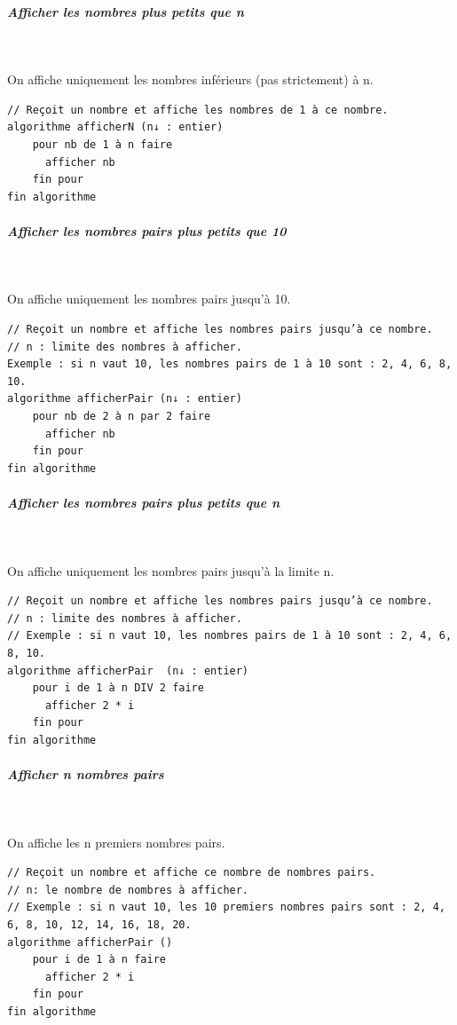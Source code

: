 \documentclass[11pt,a4paper]{article}
\begin{document}
		\subparagraph{Afficher les nombres plus petits que n} 
		
					\textcolor{white}{.} \par
				On affiche uniquement les nombres inf\'erieurs (pas strictement) \`a n.
            \par
        \begin{verbatim}
// Reçoit un nombre et affiche les nombres de 1 à ce nombre.
algorithme afficherN (n↓ : entier)
    pour nb de 1 à n faire
      afficher nb
    fin pour
fin algorithme
    \end{verbatim}
			
		\subparagraph{Afficher les nombres pairs plus petits que 10} 
		
					\textcolor{white}{.} \par
				On affiche uniquement les nombres pairs jusqu'\`a 10.
            \par
        \begin{verbatim}
// Reçoit un nombre et affiche les nombres pairs jusqu’à ce nombre.
// n : limite des nombres à afficher.
Exemple : si n vaut 10, les nombres pairs de 1 à 10 sont : 2, 4, 6, 8, 10.
algorithme afficherPair (n↓ : entier)
    pour nb de 2 à n par 2 faire
      afficher nb
    fin pour
fin algorithme
    \end{verbatim}
			
		\subparagraph{Afficher les nombres pairs plus petits que n} 
		
					\textcolor{white}{.} \par
				On affiche uniquement les nombres pairs jusqu'\`a la limite n.
            \par
        \begin{verbatim}
// Reçoit un nombre et affiche les nombres pairs jusqu’à ce nombre.
// n : limite des nombres à afficher.
// Exemple : si n vaut 10, les nombres pairs de 1 à 10 sont : 2, 4, 6, 8, 10.
algorithme afficherPair  (n↓ : entier)
    pour i de 1 à n DIV 2 faire
      afficher 2 * i
    fin pour
fin algorithme
    \end{verbatim}
			
		\subparagraph{Afficher n nombres pairs} 
		
					\textcolor{white}{.} \par
				On affiche les n premiers nombres pairs.
            \par
        \begin{verbatim}
// Reçoit un nombre et affiche ce nombre de nombres pairs.
// n: le nombre de nombres à afficher.
// Exemple : si n vaut 10, les 10 premiers nombres pairs sont : 2, 4, 6, 8, 10, 12, 14, 16, 18, 20.
algorithme afficherPair ()
    pour i de 1 à n faire
      afficher 2 * i
    fin pour
fin algorithme
    \end{verbatim}
			
\end{document}
